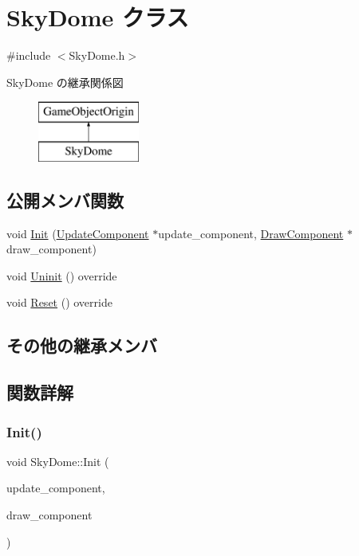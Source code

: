 \hypertarget{class_sky_dome}{}\section{Sky\+Dome クラス}
\label{class_sky_dome}


{\ttfamily \#include $<$Sky\+Dome.\+h$>$}

Sky\+Dome の継承関係図\begin{figure}[H]
\begin{center}
\leavevmode
\includegraphics[height=2.000000cm]{class_sky_dome}
\end{center}
\end{figure}
\subsection*{公開メンバ関数}
\begin{DoxyCompactItemize}
\item 
void \mbox{\hyperlink{class_sky_dome_a5ff1af02dbdfa3e5b734a22bbae78395}{Init}} (\mbox{\hyperlink{class_update_component}{Update\+Component}} $\ast$update\+\_\+component, \mbox{\hyperlink{class_draw_component}{Draw\+Component}} $\ast$draw\+\_\+component)
\item 
void \mbox{\hyperlink{class_sky_dome_a7fc71bfa671cf6e7ab26a194459b0753}{Uninit}} () override
\item 
void \mbox{\hyperlink{class_sky_dome_abc6f8ed1471d7b03f25924a849cae590}{Reset}} () override
\end{DoxyCompactItemize}
\subsection*{その他の継承メンバ}


\subsection{関数詳解}
\mbox{\label{class_sky_dome_a5ff1af02dbdfa3e5b734a22bbae78395}} 
\subsubsection{\texorpdfstring{Init()}{Init()}}
{\footnotesize\ttfamily void Sky\+Dome\+::\+Init (\begin{DoxyParamCaption}\item[{\mbox{\hyperlink{class_update_component}{Update\+Component}} $\ast$}]{update\+\_\+component,  }\item[{\mbox{\hyperlink{class_draw_component}{Draw\+Component}} $\ast$}]{draw\+\_\+component }\end{DoxyParamCaption})}

